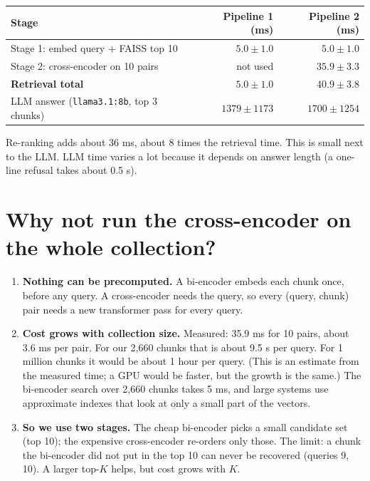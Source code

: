 \documentclass[10pt,a4paper]{article}
\newcommand{\code}[1]{\texttt{#1}}
\begin{document}
\begin{center}\small
\begin{tabular}{@{}l r r@{}}
\toprule
Stage & Pipeline 1 (ms) & Pipeline 2 (ms) \\
\midrule
Stage 1: embed query + FAISS top 10 & $5.0 \pm 1.0$ & $5.0 \pm 1.0$ \\
Stage 2: cross-encoder on 10 pairs & not used & $35.9 \pm 3.3$ \\
\textbf{Retrieval total} & $\mathbf{5.0 \pm 1.0}$ & $\mathbf{40.9 \pm 3.8}$ \\
LLM answer (\code{llama3.1:8b}, top 3 chunks) & $1379 \pm 1173$ & $1700 \pm 1254$ \\
\bottomrule
\end{tabular}
\end{center}

Re-ranking adds about 36 ms, about 8 times the retrieval time. This is small next to the LLM. LLM time varies a lot because it depends on answer length (a one-line refusal takes about 0.5 s).

\section{Why not run the cross-encoder on the whole collection?}

\begin{enumerate}
\item \textbf{Nothing can be precomputed.} A bi-encoder embeds each chunk once, before any query. A cross-encoder needs the query, so every (query, chunk) pair needs a new transformer pass for every query.
\item \textbf{Cost grows with collection size.} Measured: 35.9 ms for 10 pairs, about 3.6 ms per pair. For our 2,660 chunks that is about 9.5 s per query. For 1 million chunks it would be about 1 hour per query. (This is an estimate from the measured time; a GPU would be faster, but the growth is the same.) The bi-encoder search over 2,660 chunks takes 5 ms, and large systems use approximate indexes that look at only a small part of the vectors.
\item \textbf{So we use two stages.} The cheap bi-encoder picks a small candidate set (top 10); the expensive cross-encoder re-orders only those. The limit: a chunk the bi-encoder did not put in the top 10 can never be recovered (queries 9, 10). A larger top-$K$ helps, but cost grows with $K$.
\end{enumerate}
\end{document}
